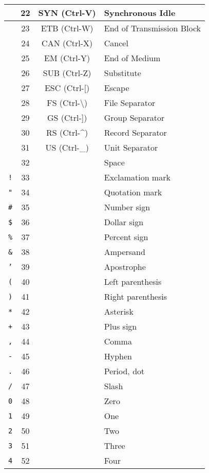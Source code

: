 \documentclass[a4paper]{article}
\theoremstyle{break}
\theoremstyle{break}
\theoremstyle{break}
\theoremstyle{break}
\begin{document}
\begin{xltabular}{\textwidth}{|c|c|c|l|}
	\hline
	& 22 & SYN (Ctrl-V) & Synchronous Idle \\
	\hline
	& 23 & ETB (Ctrl-W) & End of Transmission Block \\
	\hline
	& 24 & CAN (Ctrl-X) & Cancel \\
	\hline
	& 25 & EM (Ctrl-Y) & End of Medium \\
	\hline
	& 26 & SUB (Ctrl-Z) & Substitute \\
	\hline
	& 27 & ESC (Ctrl-[) & Escape \\
	\hline
	& 28 & FS (Ctrl-\textbackslash) & File Separator \\
	\hline
	& 29 & GS (Ctrl-]) & Group Separator \\
	\hline
	& 30 & RS (Ctrl-\textasciicircum) & Record Separator \\
	\hline
	& 31 & US (Ctrl-\_) & Unit Separator \\
	\hline
	\texttt{ } & 32 & & Space \\
	\hline
	\texttt{!} & 33 & & Exclamation mark \\
	\hline
	\texttt{"} & 34 & & Quotation mark \\
	\hline
	\texttt{\#} & 35 & & Number sign \\
	\hline
	\texttt{\$} & 36 & & Dollar sign \\
	\hline
	\texttt{\%} & 37 & & Percent sign \\
	\hline
	\texttt{\&} & 38 & & Ampersand \\
	\hline
	\texttt{'} & 39 & & Apostrophe \\
	\hline
	\texttt{(} & 40 & & Left parenthesis \\
	\hline
	\texttt{)} & 41 & & Right parenthesis \\
	\hline
	\texttt{*} & 42 & & Asterisk \\
	\hline
	\texttt{+} & 43 & & Plus sign \\
	\hline
	\texttt{,} & 44 & & Comma \\
	\hline
	\texttt{-} & 45 & & Hyphen \\
	\hline
	\texttt{.} & 46 & & Period, dot \\
	\hline
	\texttt{/} & 47 & & Slash \\
	\hline
	\texttt{0} & 48 & & Zero \\
	\hline
	\texttt{1} & 49 & & One \\
	\hline
	\texttt{2} & 50 & & Two \\
	\hline
	\texttt{3} & 51 & & Three \\
	\hline
	\texttt{4} & 52 & & Four \\

\end{xltabular}
\end{document}
